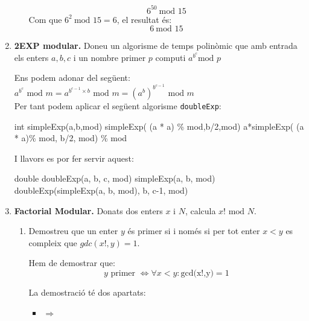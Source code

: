 \documentclass[a4paper,10pt]{article}
\begin{document}
\begin{enumerate}
\begin{enumerate}
    \begin{equation}
  6^{50}\ \textrm{mod } 15
  \end{equation}
Com que $6^2\ \textrm{mod } 15  = 6$, el resultat és:
\begin{equation}
  6\ \textrm{mod } 15
  \end{equation}
 \end{enumerate}
\item \textbf{2EXP modular. }Doneu un algorisme de temps polinòmic que amb entrada els enters $a,b,c$ i un nombre primer $p$ computi $a^{b^c} \textrm{mod } p$

Ens podem adonar del següent: \\
$ a^{b^c} \textrm{ mod } m = a^{b^{c-1} \times b} \textrm{ mod } m = (a^b)^{b^{c-1}} \textrm{ mod } m$ \\
Per tant podem aplicar el següent algorisme \texttt{doubleExp}:

\begin{algorithmic}[1]
 \STATE int simpleExp(a,b,mod)
  \RETURN simpleExp( (a * a) \% mod,b/2,mod)
 \ELSE
  \RETURN a*simpleExp( (a * a)\% mod, b/2, mod) \% mod
 \ENDIF
 
\end{algorithmic}

I llavors es por fer servir aquest:

\begin{algorithmic}[1]
 \STATE double doubleExp(a, b, c, mod)
  \RETURN simpleExp(a, b, mod)
 \ELSE
  \RETURN doubleExp(simpleExp(a, b, mod), b, c-1, mod)
 \ENDIF
\end{algorithmic}



 \item \textbf{Factorial Modular. }Donats dos enters $x$ i $N$, calcula $x! \textrm{ mod }N$.
 \begin{enumerate}
  \item Demostreu que un enter $y$ és primer si i només si per tot enter $x < y$ es compleix que $gdc(x!,y) = 1$.
  
  Hem de demostrar que:
  \begin{equation}
   y \textrm{ primer } \Leftrightarrow \forall x < y : \textrm{gcd(x!,y)} = 1
  \end{equation}
  
  La demostració té dos apartats:
  \begin{itemize}
   \item $\Rightarrow$
   

\end{itemize}
\end{enumerate}
\end{enumerate}
\end{document}
